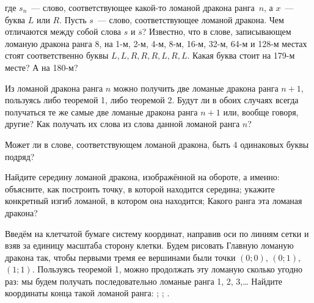 \setcounter{z}{4}
\z \setcounter{lett}{1}
 где $s_n$~---  слово, соответствующее какой-то ломаной дракона ранга~$n$, а $x$~--- буква $L$ или $R$.
  Пусть $s$~--- слово, соответствующее ломаной дракона. Чем отличаются между собой слова  $s$ и $\overline{s}$?
 Известно, что в слове, записывающем ломаную дракона
ранга 8, на 1-м, 2-м, 4-м, 8-м, 16-м, 32-м, 64-м и  128-м  местах стоят соответственно буквы $L, L, R, R, R, L, R, L$. Какая буква стоит на
179-м месте?
 А на 180-м?


\z Из ломаной дракона ранга $n$ можно получить две ломаные дракона ранга $n+1$, пользуясь либо теоремой 1, либо теоремой 2.
 Будут ли в обоих случаях всегда получаться те же самые две ломаные дракона ранга $n+1$ или, вообще говоря, другие?
 Как получать их слова из слова данной ломаной ранга $n$?

\z Может ли в слове, соответствующем ломаной дракона, быть 4 одинаковых буквы подряд?

\z Найдите  середину ломаной дракона, изображённой на обороте, а именно:
 объясните, как построить точку, в которой находится середина;
 укажите конкретный изгиб ломаной, в котором она находится;
 Какого ранга эта ломаная дракона?




\z Введём на клетчатой бумаге систему координат, направив оси по линиям сетки и взяв за единицу масштаба сторону клетки. Будем рисовать Главную ломаную дракона так, чтобы первыми тремя ее вершинами были точки $(0;0)$, $(0;1)$, $(1;1)$. Пользуясь теоремой 1, можно продолжать эту ломаную сколько угодно раз: мы будем получать последовательно ломаные ранга 1, 2, 3,\ldots %
 Найдите координаты конца такой ломаной ранга:
 ; ; .

